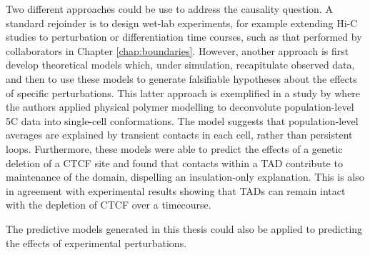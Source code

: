 \documentclass[a4paper,11pt,oneside]{book}
\begin{document}
Two different approaches could be use to address the causality question. A standard rejoinder is to design wet-lab experiments, for example extending Hi-C studies to perturbation or differentiation time courses, such as that performed by collaborators in Chapter \ref{chap:boundaries}. However, another approach is first develop theoretical models which, under simulation, recapitulate observed data, and then to use these models to generate falsifiable hypotheses about the effects of specific perturbations. This latter approach is exemplified in a study by \citet{Giorgetti2014a} where the authors applied physical polymer modelling to deconvolute population-level 5C data into single-cell conformations. The model suggests that population-level averages are explained by transient contacts in each cell, rather than persistent loops. Furthermore, these models were able to predict the effects of a genetic deletion of a CTCF site and found that contacts within a TAD contribute to maintenance of the domain, dispelling an insulation-only explanation.\cite{Giorgetti2014a} This is also in agreement with experimental results showing that TADs can remain intact with the depletion of CTCF over a timecourse.\cite{Zuin2013}

The predictive models generated in this thesis could also be applied to predicting the effects of experimental perturbations.

%
%

\end{document}

